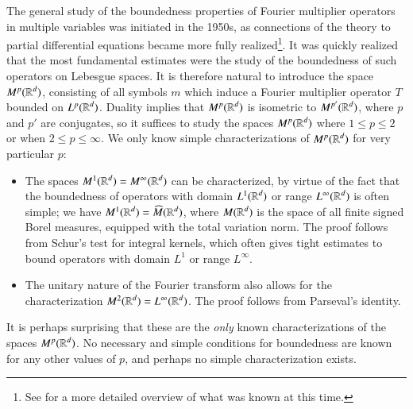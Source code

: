 The general study of the boundedness properties of Fourier multiplier operators in multiple variables was initiated in the 1950s, as connections of the theory to partial differential equations became more fully realized\footnote{See \cite{Hormander1} for a more detailed overview of what was known at this time.}. It was quickly realized that the most fundamental estimates were the study of the boundedness of such operators on Lebesgue spaces.
%
%
%
It is therefore natural to introduce the space $M^p(\operatorname{\mathbb{R}}^d)$, consisting of all symbols $m$ which induce a Fourier multiplier operator $T$ bounded on $L^p(\operatorname{\mathbb{R}}^d)$. Duality implies that $M^p(\operatorname{\mathbb{R}}^d)$ is isometric to $M^{p'}(\operatorname{\mathbb{R}}^d)$, where $p$ and $p'$ are conjugates, so it suffices to study the spaces $M^p(\operatorname{\mathbb{R}}^d)$ where $1 \leq p \leq 2$ or when $2 \leq p \leq \infty$. We only know simple characterizations of $M^p(\operatorname{\mathbb{R}}^d)$ for very particular $p$:
%
\begin{itemize}
    \item The spaces $M^1(\operatorname{\mathbb{R}}^d) = M^\infty(\operatorname{\mathbb{R}}^d)$ can be characterized, by virtue of the fact that the boundedness of operators with domain $L^1(\operatorname{\mathbb{R}}^d)$ or range $L^\infty(\operatorname{\mathbb{R}}^d)$ is often simple; we have $M^1(\operatorname{\mathbb{R}}^d) = \widehat{M}(\operatorname{\mathbb{R}}^d)$, where  $M(\operatorname{\mathbb{R}}^d)$ is the space of all finite signed Borel measures, equipped with the total variation norm. The proof follows from Schur's test for integral kernels, which often gives tight estimates to bound operators with domain $L^1$ or range $L^\infty$.

    \item The unitary nature of the Fourier transform also allows for the characterization $M^2(\operatorname{\mathbb{R}}^d) = L^\infty(\operatorname{\mathbb{R}}^d)$. The proof follows from Parseval's identity.
\end{itemize}
%
It is perhaps surprising that these are the \emph{only} known characterizations of the spaces $M^p(\operatorname{\mathbb{R}}^d)$. No necessary and simple conditions for boundedness are known for any other values of $p$, and perhaps no simple characterization exists.


